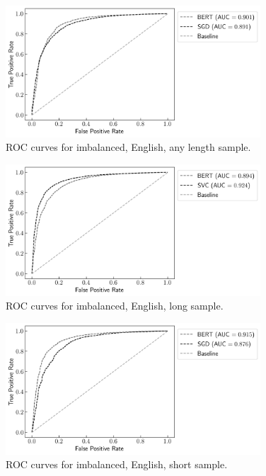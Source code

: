 \begin{figure}[!htb]
    \centering
    \includegraphics[width=0.85\textwidth]{figures/06_results/01_rfp/01_pol/02_roc/eng_any_any.png}
    \caption{ROC curves for imbalanced, English, any length sample.}
    \label{fig:A1_ROC_IEA}
\end{figure}

\begin{figure}[!htb]
    \centering
    \includegraphics[width=0.85\textwidth]{figures/06_results/01_rfp/01_pol/02_roc/eng_any_long.png}
    \caption{ROC curves for imbalanced, English, long sample.}
    \label{fig:A1_ROC_IEL}
\end{figure}

\begin{figure}[!htb]
    \centering
    \includegraphics[width=0.85\textwidth]{figures/06_results/01_rfp/01_pol/02_roc/eng_any_short.png}
    \caption{ROC curves for imbalanced, English, short sample.}
    \label{fig:A1_ROC_IES}
\end{figure}

